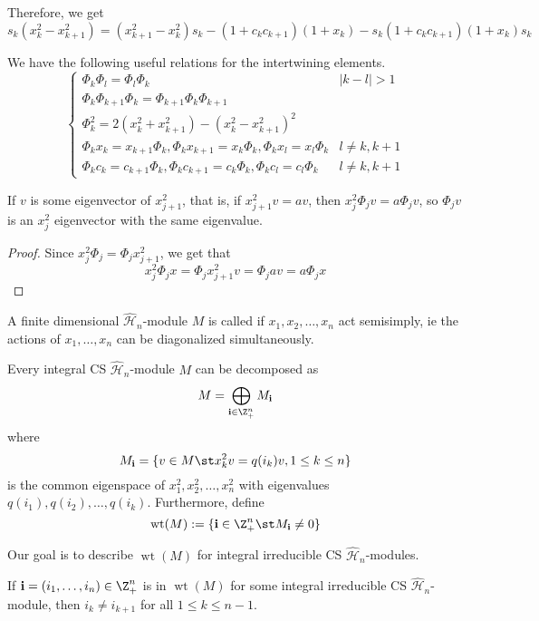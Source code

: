 \documentclass[11pt,leqno,oneside]{amsbook}
\renewcommand{\H}{\mathcal{H}}
\DeclareMathOperator{\wt}{wt}
\renewcommand{\vec}[1]{\mathbf{#1}}
\numberwithin{thm}{section}
\begin{document}
Therefore, we get \[
  s_k(x_k^2-x_{k+1}^2) = (x_{k+1}^2-x_k^2)s_k - (1+c_k c_{k+1})(1+x_k)
  - s_k (1+c_k c_{k+1})(1+x_k) s_k
\]
\begin{prop}
We have the following useful relations for the intertwining elements.
\[
  \begin{cases}
    \Phi_k \Phi_l = \Phi_l \Phi_k & |k-l| > 1\\
    \Phi_k \Phi_{k+1} \Phi_k = \Phi_{k+1} \Phi_k \Phi_{k+1}\\
    \Phi_k^2 = 2(x_k^2+x_{k+1}^2) - (x_k^2 - x_{k+1}^2)^2\\
    \Phi_k x_k = x_{k+1} \Phi_k, \Phi_k x_{k+1} = x_k \Phi_k, \Phi_k
    x_l = x_l \Phi_k & l \neq k,k+1\\
    \Phi_k c_k = c_{k+1} \Phi_k, \Phi_k c_{k+1} = c_k \Phi_k, \Phi_k
    c_l = c_l \Phi_k & l \neq k,k+1
  \end{cases}
\]
\end{prop}
\begin{prop}
  If \(v\) is some eigenvector of \(x_{j+1}^2\), that is, if
  \(x_{j+1}^2 v 
= av\), then \(x_j^2 \Phi_j v = a \Phi_j v\), so \(\Phi_j v\) is an
\(x_j^2\) eigenvector with the same eigenvalue.
\end{prop}
\begin{proof}
  Since \(x_j^2 \Phi_j = \Phi_j x_{j+1}^2\), we get that \[
    x_j^2 \Phi_j x = \Phi_j x_{j+1}^2 v = \Phi_j a v = a \Phi_j x
  \]
\end{proof}
\begin{defn}
  A finite dimensional \(\hat{\H}_n\)-module \(M\) is called
   if \(x_1, x_2, \ldots, x_n\) act
  semisimply, ie the actions of \(x_1, \ldots, x_n\) can be
  diagonalized simultaneously.
\end{defn}
\begin{prop}\label{weight-decomposition}
  Every integral CS \(\hat{\H}_n\)-module \(M\) can be decomposed
  as \[
    M = \bigoplus_{\vec{i} \in \Z_+^n} M_{\vec{i}}
  \]
  where \[
    M_{\vec{i}} = \{v \in M \st x_k^2 v = q(i_k)v, 1 \leq k \leq n\}
  \]
  is the common eigenspace of \(x_1^2, x_2^2, \ldots, x_n^2\) with
  eigenvalues \(q(i_1), q(i_2), \ldots, q(i_k)\). Furthermore,
  define \[
    \wt(M) := \{\vec{i} \in \Z_+^n \st M_{\vec{i}} \neq 0\}
  \]
\end{prop}
Our goal is to describe \(\wt(M)\) for integral irreducible CS
\(\hat{\H}_n\)-modules.
\begin{lem}\label{consecutive-weights-distinct}
  If \(\vec{i} = (i_1, \ldots, i_n) \in \Z_+^n\) is in \(\wt(M)\) for
  some integral irreducible CS \(\hat{\H}_n\)-module, then \(i_k \neq
  i_{k+1}\) for all \(1 \leq k \leq n-1\).
\end{lem}
\end{document}
